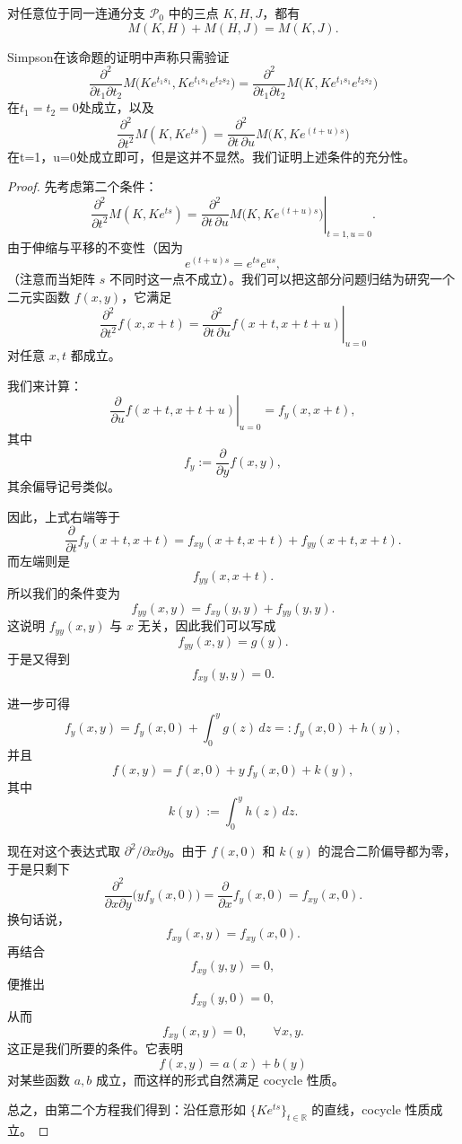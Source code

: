 \begin{proposition}[{\cite[Proposition~5.1]{Si1}}]
    对任意位于同一连通分支 \(\mathcal{P}_0\) 中的三点 \(K,H,J\)，都有
\[
M(K,H)+M(H,J)=M(K,J).
\]

Simpson在该命题的证明中声称只需验证
\[
\frac{\partial^2}{\partial t_1\partial t_2}
M\bigl(Ke^{t_1s_1},Ke^{t_1s_1}e^{t_2s_2}\bigr)
=
\frac{\partial^2}{\partial t_1\partial t_2}
M\bigl(K,Ke^{t_1s_1}e^{t_2s_2}\bigr)
\]
在$t_1=t_2=0$处成立，以及
\[
\frac{\partial^2}{\partial t^2}M(K,Ke^{ts})
=
\frac{\partial^2}{\partial t\,\partial u}M\bigl(K,Ke^{(t+u)s}\bigr)
\]
在t=1，u=0处成立即可，但是这并不显然。我们证明上述条件的充分性。
\begin{proof}
先考虑第二个条件：
\[
\frac{\partial^2}{\partial t^2}M(K,Ke^{ts})
=
\left.\frac{\partial^2}{\partial t\,\partial u}M\bigl(K,Ke^{(t+u)s}\bigr)\right|_{t=1,u=0}.
\]
由于伸缩与平移的不变性（因为
\[
e^{(t+u)s}=e^{ts}e^{us},
\]
（注意而当矩阵 \(s\) 不同时这一点不成立）。我们可以把这部分问题归结为研究一个二元实函数 \(f(x,y)\)，它满足
\[
\frac{\partial^2}{\partial t^2}f(x,x+t)
=
\left.\frac{\partial^2}{\partial t\,\partial u}f(x+t,x+t+u)\right|_{u=0}
\]
对任意 \(x,t\) 都成立。

我们来计算：
\[
\left.\frac{\partial}{\partial u}f(x+t,x+t+u)\right|_{u=0}
=
f_y(x,x+t),
\]
其中
\[
f_y:=\frac{\partial}{\partial y}f(x,y),
\]
其余偏导记号类似。

因此，上式右端等于
\[
\frac{\partial}{\partial t}f_y(x+t,x+t)
=
f_{xy}(x+t,x+t)+f_{yy}(x+t,x+t).
\]
而左端则是
\[
f_{yy}(x,x+t).
\]
所以我们的条件变为
\[
f_{yy}(x,y)=f_{xy}(y,y)+f_{yy}(y,y).
\]
这说明 \(f_{yy}(x,y)\) 与 \(x\) 无关，因此我们可以写成
\[
f_{yy}(x,y)=g(y).
\]
于是又得到
\[
f_{xy}(y,y)=0.
\]

进一步可得
\[
f_y(x,y)=f_y(x,0)+\int_0^y g(z)\,dz=:f_y(x,0)+h(y),
\]
并且
\[
f(x,y)=f(x,0)+y\,f_y(x,0)+k(y),
\]
其中
\[
k(y):=\int_0^y h(z)\,dz.
\]

现在对这个表达式取 \(\partial^2/\partial x\partial y\)。由于 \(f(x,0)\) 和 \(k(y)\) 的混合二阶偏导都为零，于是只剩下
\[
\frac{\partial^2}{\partial x\partial y}\bigl(yf_y(x,0)\bigr)
=
\frac{\partial}{\partial x}f_y(x,0)
=
f_{xy}(x,0).
\]
换句话说，
\[
f_{xy}(x,y)=f_{xy}(x,0).
\]
再结合
\[
f_{xy}(y,y)=0,
\]
便推出
\[
f_{xy}(y,0)=0,
\]
从而
\[
f_{xy}(x,y)=0,\qquad \forall x,y.
\]
这正是我们所要的条件。它表明
\[
f(x,y)=a(x)+b(y)
\]
对某些函数 \(a,b\) 成立，而这样的形式自然满足 cocycle 性质。

总之，由第二个方程我们得到：沿任意形如 \(\{Ke^{ts}\}_{t\in\mathbb R}\) 的直线，cocycle 性质成立。


\end{proof}
\end{proposition}
